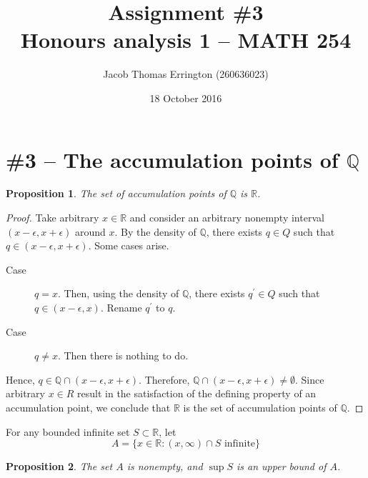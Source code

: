\documentclass[letterpaper,11pt]{article}
\author{Jacob Thomas Errington (260636023)}
\title{Assignment \#3\\Honours analysis 1 -- MATH 254}
\date{18 October 2016}
\newtheorem{prop}{Proposition}
\newcommand{\R}{\mathbb{R}}
\newcommand{\Q}{\mathbb{Q}}
\begin{document}
\maketitle

\section*{\#3 -- The accumulation points of $\Q$}

\begin{prop}
    The set of accumulation points of $\Q$ is $\R$.
\end{prop}

\begin{proof}
    Take arbitrary $x \in \R$ and consider an arbitrary nonempty interval
    $(x - \epsilon, x + \epsilon)$ around $x$. By the density of $\Q$, there
    exists $q \in Q$ such that $q \in (x - \epsilon, x + \epsilon)$.
    Some cases arise.
    \begin{description}
        \item[Case] $q = x$. Then, using the density of $\Q$, there exists
            $q^\prime \in Q$ such that $q \in (x - \epsilon, x)$. Rename
            $q^\prime$ to $q$.
        \item[Case] $q \neq x$. Then there is nothing to do.
    \end{description}
    Hence, $q \in \Q \cap (x - \epsilon, x + \epsilon)$. Therefore,
    $\Q \cap (x - \epsilon, x + \epsilon) \neq \emptyset$. Since arbitrary
    $x \in R$ result in the satisfaction of the defining property of an
    accumulation point, we conclude that $\R$ is the set of accumulation points
    of $\Q$.
\end{proof}

For any bounded infinite set $S \subset \R$, let
\begin{equation*}
    A = \{ x \in \R : (x, \infty) \cap S \text{ infinite}\}
\end{equation*}

\begin{prop}
    The set $A$ is nonempty, and $\sup{S}$ is an upper bound of $A$.
\end{prop}
\end{document}
